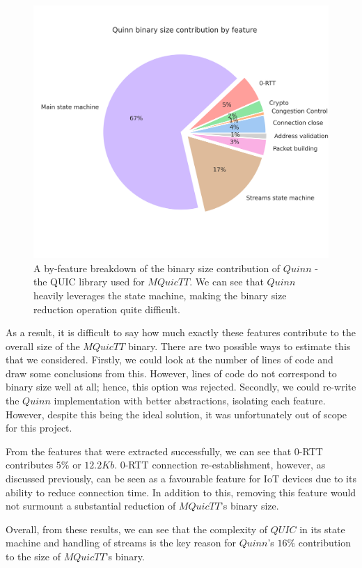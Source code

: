 \begin{figure}[t]
    \centering
    \includegraphics[width=0.75\linewidth]{images/mquictt_binary_by_function.png}
    \caption{A by-feature breakdown of the binary size contribution of $Quinn$ - the QUIC library used for $MQuicTT$. We can see that $Quinn$ heavily leverages the state machine, making the binary size reduction operation quite difficult.}
    \label{fig:mquictt_bin_func}
\end{figure}

As a result, it is difficult to say how much exactly these features contribute to the overall size of the $MQuicTT$ binary.
There are two possible ways to estimate this that we considered.
Firstly, we could look at the number of lines of code and draw some conclusions from this.
However, lines of code do not correspond to binary size well at all; hence, this option was rejected.
Secondly, we could re-write the $Quinn$ implementation with better abstractions, isolating each feature.
However, despite this being the ideal solution, it was unfortunately out of scope for this project.

From the features that were extracted successfully, we can see that 0-RTT contributes $5\%$ or $12.2Kb$.
0-RTT connection re-establishment, however, as discussed previously, can be seen as a favourable feature for IoT devices due to its ability to reduce connection time.
In addition to this, removing this feature would not surmount a substantial reduction of $MQuicTT$'s binary size.

Overall, from these results, we can see that the complexity of $QUIC$ in its state machine and handling of streams is the key reason for $Quinn$'s $16\%$ contribution to the size of $MQuicTT$'s binary.

